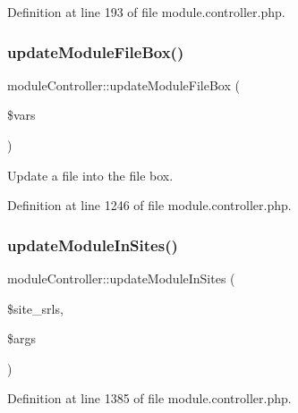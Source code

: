 Definition at line 193 of file module.\+controller.\+php.

\hypertarget{classmoduleController_af1ea81da50538369f648be26252ddd26}{}\label{classmoduleController_af1ea81da50538369f648be26252ddd26} 
\subsubsection{\texorpdfstring{update\+Module\+File\+Box()}{updateModuleFileBox()}}
{\footnotesize\ttfamily module\+Controller\+::update\+Module\+File\+Box (\begin{DoxyParamCaption}\item[{}]{\$vars }\end{DoxyParamCaption})}



Update a file into the file box. 



Definition at line 1246 of file module.\+controller.\+php.

\hypertarget{classmoduleController_a1d2d1c0845ee050c4f837dea9b9beab1}{}\label{classmoduleController_a1d2d1c0845ee050c4f837dea9b9beab1} 
\subsubsection{\texorpdfstring{update\+Module\+In\+Sites()}{updateModuleInSites()}}
{\footnotesize\ttfamily module\+Controller\+::update\+Module\+In\+Sites (\begin{DoxyParamCaption}\item[{}]{\$site\+\_\+srls,  }\item[{}]{\$args }\end{DoxyParamCaption})}



Definition at line 1385 of file module.\+controller.\+php.

\hypertarget{classmoduleController_a4789510265aa0276d79e29cb9d9ce24c}{}\label{classmoduleController_a4789510265aa0276d79e29cb9d9ce24c} 
